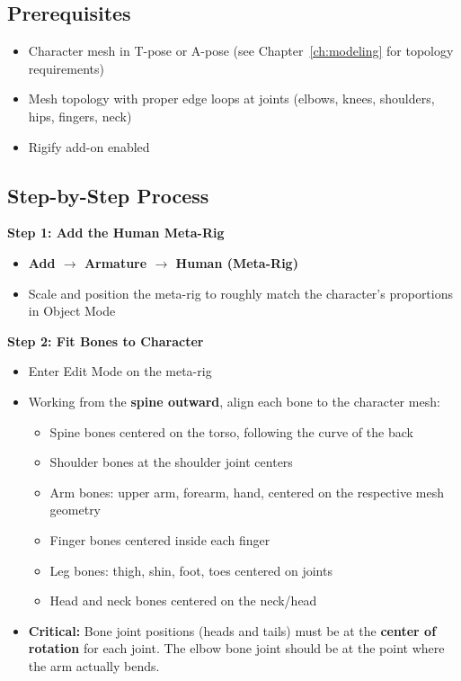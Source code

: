 \subsection{Prerequisites}

\begin{itemize}[leftmargin=2em]
  \item Character mesh in T-pose or A-pose (see Chapter~\ref{ch:modeling} for topology requirements)
  \item Mesh topology with proper edge loops at joints (elbows, knees, shoulders, hips, fingers, neck)
  \item Rigify add-on enabled
\end{itemize}

\subsection{Step-by-Step Process}

\textbf{Step 1: Add the Human Meta-Rig}
\begin{itemize}[leftmargin=2em]
  \item \textbf{Add $\rightarrow$ Armature $\rightarrow$ Human (Meta-Rig)}
  \item Scale and position the meta-rig to roughly match the character's proportions in Object Mode
\end{itemize}

\textbf{Step 2: Fit Bones to Character}
\begin{itemize}[leftmargin=2em]
  \item Enter Edit Mode on the meta-rig
  \item Working from the \textbf{spine outward}, align each bone to the character mesh:
  \begin{itemize}[leftmargin=1.5em]
    \item Spine bones centered on the torso, following the curve of the back
    \item Shoulder bones at the shoulder joint centers
    \item Arm bones: upper arm, forearm, hand, centered on the respective mesh geometry
    \item Finger bones centered inside each finger
    \item Leg bones: thigh, shin, foot, toes centered on joints
    \item Head and neck bones centered on the neck/head
  \end{itemize}
  \item \textbf{Critical:} Bone joint positions (heads and tails) must be at the \textbf{center of rotation} for each joint. The elbow bone joint should be at the point where the arm actually bends.
\end{itemize}

